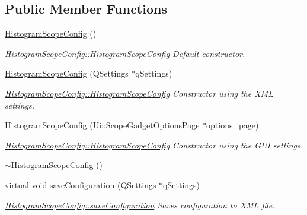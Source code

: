 \subsection*{\-Public \-Member \-Functions}
\begin{DoxyCompactItemize}
\item 
\hyperlink{group___scope_plugin_ga3770fc706fe9b5fdd16bad59dfc23fa1}{\-Histogram\-Scope\-Config} ()
\begin{DoxyCompactList}\small\item\em \hyperlink{group___scope_plugin_ga3770fc706fe9b5fdd16bad59dfc23fa1}{\-Histogram\-Scope\-Config\-::\-Histogram\-Scope\-Config} \-Default constructor. \end{DoxyCompactList}\item 
\hyperlink{group___scope_plugin_ga0a412b8c840e9f5bc746d492cafed2a5}{\-Histogram\-Scope\-Config} (\-Q\-Settings $\ast$q\-Settings)
\begin{DoxyCompactList}\small\item\em \hyperlink{group___scope_plugin_ga3770fc706fe9b5fdd16bad59dfc23fa1}{\-Histogram\-Scope\-Config\-::\-Histogram\-Scope\-Config} \-Constructor using the \-X\-M\-L settings. \end{DoxyCompactList}\item 
\hyperlink{group___scope_plugin_gaa8c3ad4f914751d27033f2c70ea2fc2c}{\-Histogram\-Scope\-Config} (\-Ui\-::\-Scope\-Gadget\-Options\-Page $\ast$options\-\_\-page)
\begin{DoxyCompactList}\small\item\em \hyperlink{group___scope_plugin_ga3770fc706fe9b5fdd16bad59dfc23fa1}{\-Histogram\-Scope\-Config\-::\-Histogram\-Scope\-Config} \-Constructor using the \-G\-U\-I settings. \end{DoxyCompactList}\item 
\hyperlink{group___scope_plugin_gafbd12c48895f5b324a0048f956c2a773}{$\sim$\-Histogram\-Scope\-Config} ()
\item 
virtual \hyperlink{group___u_a_v_objects_plugin_ga444cf2ff3f0ecbe028adce838d373f5c}{void} \hyperlink{group___scope_plugin_ga08dd5f7ac27b067ed6eddc9e645bce45}{save\-Configuration} (\-Q\-Settings $\ast$q\-Settings)
\begin{DoxyCompactList}\small\item\em \hyperlink{group___scope_plugin_ga08dd5f7ac27b067ed6eddc9e645bce45}{\-Histogram\-Scope\-Config\-::save\-Configuration} \-Saves configuration to \-X\-M\-L file. \end{DoxyCompactList}\item 

\end{DoxyCompactItemize}
